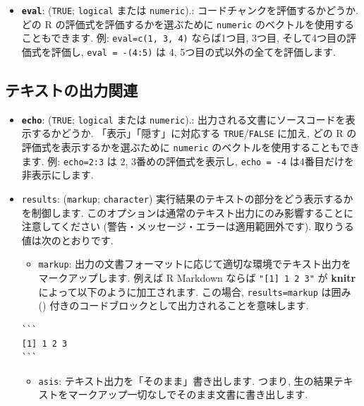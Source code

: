\documentclass[
  11pt,
  lualatex,
  ja=standard]{bxjsreport}
\providecommand{\tightlist}{%
  \setlength{\itemsep}{0pt}\setlength{\parskip}{0pt}}
\begin{document}
\begin{itemize}
\tightlist
\item
  \textbf{\texttt{eval}}: (\texttt{TRUE}; \texttt{logical} または \texttt{numeric}).: コードチャンクを評価するかどうか. どの R の評価式を評価するかを選ぶために \texttt{numeric} のベクトルを使用することもできます. 例: \texttt{eval=c(1, 3, 4)} ならば1つ目, 3つ目, そして4つ目の評価式を評価し, \texttt{eval = -(4:5)} は 4, 5つ目の式以外の全てを評価します.
\end{itemize}

\hypertarget{text-output}{%
\subsection{テキストの出力関連}\label{text-output}}

\begin{itemize}
\tightlist
\item
  \textbf{\texttt{echo}}: (\texttt{TRUE}; \texttt{logical} または \texttt{numeric}).: 出力される文書にソースコードを表示するかどうか. 「表示」「隠す」に対応する \texttt{TRUE}/\texttt{FALSE} に加え, どの R の評価式を表示するかを選ぶために \texttt{numeric} のベクトルを使用することもできます. 例: \texttt{echo=2:3} は 2, 3番めの評価式を表示し, \texttt{echo = -4} は4番目だけを非表示にします.
\item
  \texttt{results}: (\texttt{\textquotesingle{}markup\textquotesingle{}}; \texttt{character}) 実行結果のテキストの部分をどう表示するかを制御します. このオプションは通常のテキスト出力にのみ影響することに注意してください (警告・メッセージ・エラーは適用範囲外です). 取りうる値は次のとおりです.

  \begin{itemize}
  \tightlist
  \item
    \texttt{markup}: 出力の文書フォーマットに応じて適切な環境でテキスト出力をマークアップします. 例えば R Markdown ならば \texttt{"{[}1{]}\ 1\ 2\ 3"} が \textbf{knitr} によって以下のように加工されます. この場合, \texttt{results=\textquotesingle{}markup\textquotesingle{}} は囲み (\texttt{\textasciigrave{}\textasciigrave{}\textasciigrave{}}) 付きのコードブロックとして出力されることを意味します.
  \end{itemize}

\begin{verbatim}
```
[1] 1 2 3
```
\end{verbatim}

  \begin{itemize}
  \tightlist
  \item
    \texttt{asis}: テキスト出力を「そのまま」書き出します. つまり, 生の結果テキストをマークアップ一切なしでそのまま文書に書き出します.
  \end{itemize}


\end{itemize}
\end{document}
